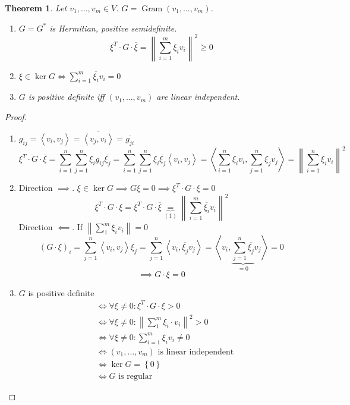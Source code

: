 \documentclass{article}
\newtheorem{theorem}{Theorem}  \numberwithin{theorem}{section}
\newcommand{\set}[1]{\left\{#1\right\}}
\newcommand{\ip}[2]{\left\langle#1,#2\right\rangle} %
\newcommand{\norm}[1]{\left\|#1\right\|}
\begin{document}
\begin{theorem} %
  Let $v_1, \ldots, v_m \in V$. $G = \operatorname{Gram}(v_1, \ldots, v_m)$.
  \begin{enumerate}
    \item $G = G^*$ is Hermitian, positive \emph{semi}definite.
      \[ \xi^T \cdot G \cdot \overline{\xi} = \norm{\sum_{i=1}^m \xi_i v_i}^2 \geq 0 \]
    \item $\xi \in \ker{G} \iff \sum_{i=1}^m \overline{\xi_i} v_i = 0$
    \item $G$ is positive definite iff $(v_1, \ldots, v_m)$ are linear independent.
  \end{enumerate}
\end{theorem}

\begin{proof}
  \begin{enumerate}
    \item $g_{ij} = \ip{v_i}{v_j} = \overline{\ip{v_j}{v_i}} = \overline{g_{ji}}$
      \[ \xi^T \cdot G \cdot \overline{\xi} = \sum_{i=1}^n \sum_{j=1}^n \xi_i g_{ij} \overline{\xi_j} = \sum_{i=1}^n \sum_{j=1}^n \xi_i \overline{\xi_j} \ip{v_i}{v_j} = \ip{\sum_{i=1}^n \xi_i v_i}{\sum_{j=1}^n \xi_j v_j} = \norm{\sum_{i=1}^n \xi_i v_i}^2 \]
    \item
      Direction $\implies$.
      $\xi \in \ker{G} \implies G \xi = 0 \implies \xi^T \cdot G \cdot \xi = 0$
      \[ \xi^T \cdot G \cdot \xi = \xi^T \cdot G \cdot \overline{\xi} \underbrace{=}_{(1)} \norm{\sum_{i=1}^m \overline{\xi_i} v_i}^2 \]
      Direction $\impliedby$. If $\norm{\sum_1^m \xi_i v_i} = 0$
      \[ (G \cdot \xi)_i = \sum_{j=1}^n \ip{v_i}{v_j} \xi_j = \sum_{j=1}^n \ip{v_i}{\overline{\xi_j} v_j} = \ip{v_i}{\underbrace{\sum_{j=1}^n \overline{\xi_j}}_{=0} v_j} = 0 \]
      \[ \implies G \cdot \xi = 0 \]
    \item $G$ is positive definite
      \begin{align*}
        &\iff \forall \xi \neq 0: \xi^T \cdot G \cdot \xi > 0 \\
        &\iff \forall \xi \neq 0: \norm{\sum_1^m \xi_i \cdot v_i}^2 > 0 \\
        &\iff \forall \xi \neq 0: \sum_{i=1}^m \xi_i v_i \neq 0 \\
        &\iff (v_1, \ldots, v_m) \text{ is linear independent} \\
        &\iff \ker{G} = \set{0} \\
        &\iff G \text{ is regular}
      \end{align*}
  \end{enumerate}
\end{proof}
\end{document}
